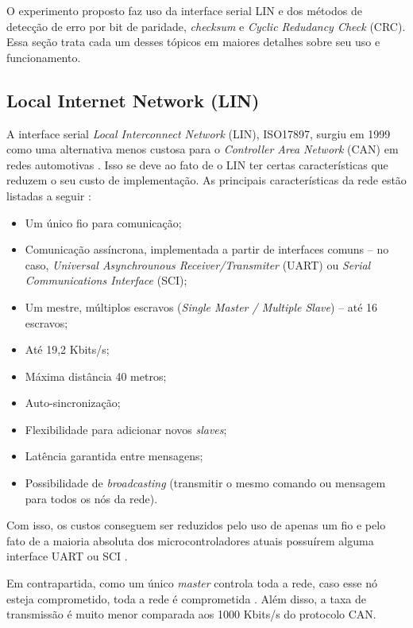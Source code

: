 

O experimento proposto faz uso da interface serial LIN e dos métodos de detecção de erro por bit de paridade, \textit{checksum} e \textit{Cyclic Redudancy Check} (CRC). Essa seção trata cada um desses tópicos em maiores detalhes sobre seu uso e funcionamento.

\subsection{Local Internet Network (LIN)}
\label{fund:lin}

A interface serial \textit{Local Interconnect Network} (LIN), ISO17897, surgiu em 1999 como uma alternativa menos custosa para o \textit{Controller Area Network} (CAN) em redes automotivas \cite{xu2006application}. Isso se deve ao fato de o LIN ter certas características que reduzem o seu custo de implementação. As principais características da rede estão listadas a seguir \cite{popa2006lin, gabriel:2003, xu2006application}:

\begin{itemize}
    \item Um único fio para comunicação;
    \item Comunicação assíncrona, implementada a partir de interfaces comuns -- no caso, \textit{Universal Asynchrounous Receiver/Transmiter} (UART) ou \textit{Serial Communications Interface} (SCI);
    \item Um mestre, múltiplos escravos (\textit{Single Master / Multiple Slave}) -- até 16 escravos;
    \item Até 19,2 Kbits/s;
    \item Máxima distância 40 metros;
    \item Auto-sincronização;
    \item Flexibilidade para adicionar novos \textit{slaves};
    \item Latência garantida entre mensagens;
    \item Possibilidade de \textit{broadcasting} (transmitir o mesmo comando ou mensagem para todos os nós da rede).
\end{itemize}

Com isso, os custos conseguem ser reduzidos pelo uso de apenas um fio e pelo fato de a maioria absoluta dos microcontroladores atuais possuírem alguma interface UART ou SCI \cite{gabriel:2003}.

Em contrapartida, como um único \textit{master} controla toda a rede, caso esse nó esteja comprometido, toda a rede é comprometida \cite{ernst:2018}. Além disso, a taxa de transmissão é muito menor comparada aos 1000 Kbits/s do protocolo CAN.

